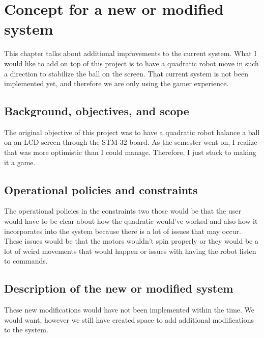 
\chapter{Concept for a new or modified system}
\label{loc:Concept for a new or modified system}
% 

This chapter talks about additional improvements to the current system. What I would like to add on top of this project is to have a quadratic robot move in such a direction to stabilize the ball on the screen. That current system is not been implemented yet, and therefore we are only using the gamer experience.


\section{Background, objectives, and scope}
\label{loc:Background, objectives, and scope}
% 

The original objective of this project was to have a quadratic robot balance a ball on an LCD screen through the STM 32 board. As the semester went on, I realize that was more optimistic than I could manage. Therefore, I just stuck to making it a game.


\section{Operational policies and constraints}
\label{loc:Operational policies and constraints}
% 
The operational policies in the constraints two those would be that the user would have to be clear about how the quadratic would've worked and also how it incorporates into the system because there is a lot of issues that may occur. These issues would be that the motors wouldn't spin properly or they would be a lot of weird movements that would happen or issues with having the robot listen to commands.

\section{Description of the new or modified system}
\label{loc:Description of the new or modified system}
% 

These new modifications would have not been implemented within the time. We would want, however we still have created space to add additional modifications to the system.


